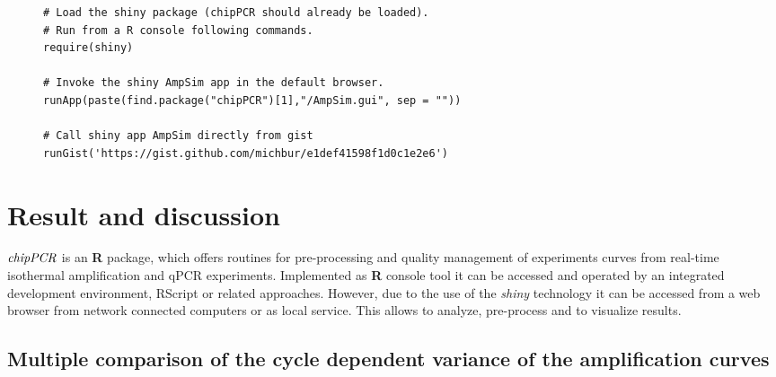 \documentclass[twocolumn]{bmcart}%
\begin{document}
\begin{figure*}
\begin{verbatim}
# Load the shiny package (chipPCR should already be loaded).
# Run from a R console following commands.
require(shiny)

# Invoke the shiny AmpSim app in the default browser.
runApp(paste(find.package("chipPCR")[1],"/AmpSim.gui", sep = ""))

# Call shiny app AmpSim directly from gist
runGist('https://gist.github.com/michbur/e1def41598f1d0c1e2e6')
\end{verbatim}
\end{figure*}

\section*{Result and discussion}

$\emph{chipPCR}$ is an \textbf{R} package, which offers routines for 
pre-processing and quality management of experiments curves from real-time 
isothermal amplification and qPCR experiments. Implemented as \textbf{R} 
console tool it can be accessed and operated by an integrated development 
environment, RScript or related approaches. However, due to the use of the 
\emph{shiny} technology it can be accessed from a web browser from network 
connected computers or as local service. This allows to analyze, pre-process 
and to visualize results.

\subsection*{Multiple comparison of the cycle dependent variance of the 
amplification curves}
\end{document}
